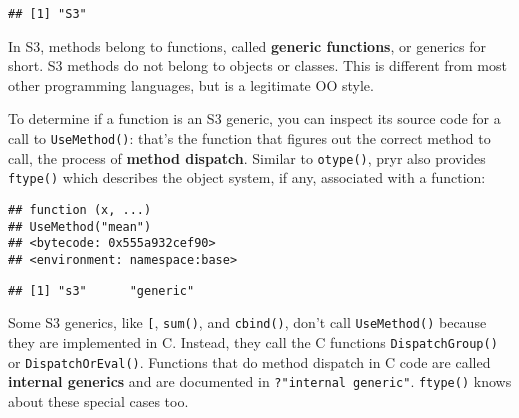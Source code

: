 \begin{Shaded}
\begin{Highlighting}[]
\OperatorTok{$}
\end{Highlighting}
\end{Shaded}

\begin{verbatim}
## [1] "S3"
\end{verbatim}

In S3, methods belong to functions, called \textbf{generic functions},
or generics for short. S3 methods do not belong to objects or classes.
This is different from most other programming languages, but is a
legitimate OO style. 
 

To determine if a function is an S3 generic, you can inspect its source
code for a call to \texttt{UseMethod()}: that's the function that
figures out the correct method to call, the process of \textbf{method
dispatch}. Similar to \texttt{otype()}, pryr also provides
\texttt{ftype()} which describes the object system, if any, associated
with a function: 

\begin{Shaded}
\begin{Highlighting}[]
\end{Highlighting}
\end{Shaded}

\begin{verbatim}
## function (x, ...) 
## UseMethod("mean")
## <bytecode: 0x555a932cef90>
## <environment: namespace:base>
\end{verbatim}

\begin{Shaded}
\begin{Highlighting}[]
\end{Highlighting}
\end{Shaded}

\begin{verbatim}
## [1] "s3"      "generic"
\end{verbatim}

Some S3 generics, like \texttt{{[}}, \texttt{sum()}, and
\texttt{cbind()}, don't call \texttt{UseMethod()} because they are
implemented in C. Instead, they call the C functions
\texttt{DispatchGroup()} or \texttt{DispatchOrEval()}. Functions that do
method dispatch in C code are called \textbf{internal generics} and are
documented in \texttt{?"internal\ generic"}. \texttt{ftype()} knows
about these special cases too.


